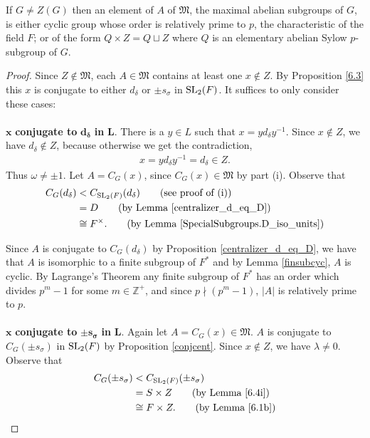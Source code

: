 \begin{lemma}
\label{MaximalAbelianSubgroup.IsCyclic_and_card_coprime_CharP_or_eq_Q_join_Z_of_center_ne}
\leanok
If $G \ne Z(G)$ then an element of $A$ of $\mathfrak{M}$, the maximal abelian subgroups of $G$, is either cyclic group whose order is relatively prime to $p$, the characteristic of the field $F$; or of the form $Q \times Z = Q \sqcup Z$ where $Q$ is an elementary abelian Sylow $p$-subgroup of $G$.
\end{lemma}
\begin{proof}
  Since $Z \not \in \mathfrak{M}$, each $A \in \mathfrak{M}$ contains at least one $x \not \in Z$. By Proposition  \ref{6.3} this $x$ is conjugate to either $d_\delta$ or $\pm s_\sigma$ in $\operatorname{SL}_2(F)$. It suffices to only consider these cases: \\
  \\
   \space $\pmb{x}$ \textbf{conjugate to} $\pmb{d_\delta}$ \textbf{in} $\pmb {L}$. There is a $y \in L$ such that $x = y d_\delta y^{-1}$. Since $x \not \in Z$, we have $d_\delta \not \in Z$, because otherwise we get the contradiction,
  \begin{align*} x =  y d_\delta y^{-1} = d_\delta \in Z.
  \end{align*}
  Thus $\omega \neq \pm 1$. Let $A = C_G(x)$, since $C_G(x) \in \mathfrak{M}$ by part (i). Observe that
  \begin{align*}  C_G(d_\delta) &<  C_{\SL_2(F)}(d_\delta)  \tag{see proof of (i)}
  \\ &= D  \tag{by Lemma \ref{centralizer_d_eq_D}}
  \\ &\cong F^\times.  \tag{by Lemma \ref{SpecialSubgroups.D_iso_units}}
  \end{align*}
  
  Since $A$ is conjugate to $C_G(d_\delta)$ by Proposition \ref{centralizer_d_eq_D}, we have that $A$ is isomorphic to a finite subgroup of $F^*$ and by Lemma \ref{finsubcyc}, $A$ is cyclic. By Lagrange's Theorem any finite subgroup of $F^*$ has an order which divides $p^m - 1$ for some $m \in \mathbb{Z}^+$, and since $p \nmid (p^m - 1)$, $|A|$ is relatively prime to $p$. \\
  \\
   \space $\pmb{x}$ \textbf{conjugate to} $\pmb{\pm s_\sigma}$ \textbf{in} $\pmb{L}$. Again let $A = C_G(x) \in \mathfrak{M}$. $A$ is conjugate to $C_G({\pm s_\sigma})$ in $\operatorname{SL}_2(F)$ by Proposition \ref{conjcent}. Since $x \notin Z$, we have $\lambda \neq 0$. Observe that
  \begin{align*}  C_G({\pm s_\sigma}) &<  C_{\SL_2(F)}({\pm s_\sigma})
  \\&= S \times Z  \tag{by Lemma \ref{6.4i}}
  \\&\cong F \times Z. \tag{by Lemma \ref{6.1b}}
  \end{align*}
  

\end{proof}
